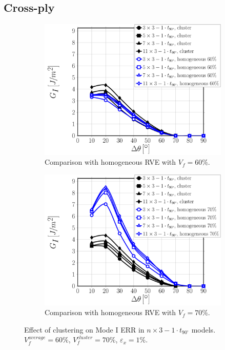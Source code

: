 \documentclass[review]{elsarticle}
\begin{document}
\subsection{Cross-ply}\label{subsec:crossply}

\begin{figure}[!h]
\centering
    \begin{subfigure}[b]{0.475\textwidth}
        \includegraphics[width=\textwidth]{nx1-1t90-vf60-GI.pdf}
        \caption{Comparison with homogeneous RVE with $V_{f}=60\%$.}\label{subfig:cluster1t90nx3ModeI60}
    \end{subfigure}\quad
    \begin{subfigure}[b]{0.475\textwidth}
        \includegraphics[width=\textwidth]{nx1-1t90-vf70-GI.pdf}
        \caption{Comparison with homogeneous RVE with $V_{f}=70\%$.}\label{subfig:cluster1t90nx3ModeI70}
    \end{subfigure}

\caption{Effect of clustering on Mode I ERR in $n\times 3-1\cdot t_{90^{\circ}}$ models. $V^{average}_{f}=60\%$, $V^{cluster}_{f}=70\%$, $\varepsilon_{x}=1\%$.}\label{fig:cluster1t90nx3ModeI}
\end{figure}
\end{document}
